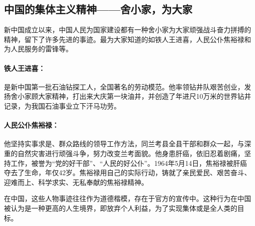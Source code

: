 \subsection{中国的集体主义精神——舍小家，为大家}
\par
新中国成立以来，中国人民为国家建设都有一种舍小家为大家顽强战斗奋力拼搏的精神，留下了许多先进的事迹。最为大家知道的如铁人王进喜，人民公仆焦裕禄和为人民服务的雷锋等。

\paragraph{铁人王进喜：}
是新中国第一批石油钻探工人，全国著名的劳动模范。他率领钻井队艰苦创业，发扬舍小家顾大家精神，打出来大庆第一块油井，并创造了年进尺10万米的世界钻井记录，为我国石油事业立下汗马功劳。
\paragraph{人民公仆焦裕禄：}
他坚持实事求是、群众路线的领导工作方法，同兰考县全县干部和群众一起，与深重的自然灾害进行顽强斗争，努力改变兰考面貌。他身患肝癌，依旧忍着剧痛，坚持工作，被誉为“党的好干部”、“人民的好公仆”。1964年5月14日，焦裕禄被肝癌夺去了生命，年仅42岁。焦裕禄用自己的实际行动，铸就了亲民爱民、艰苦奋斗、迎难而上、科学求实、无私奉献的焦裕禄精神。
\par
在中国，这些人物事迹往往作为道德楷模，存在于官方的宣传中。这种行为在中国被认为是一种更高的人生境界，即放弃个人利益，为了实现集体或是全人类的目标。
